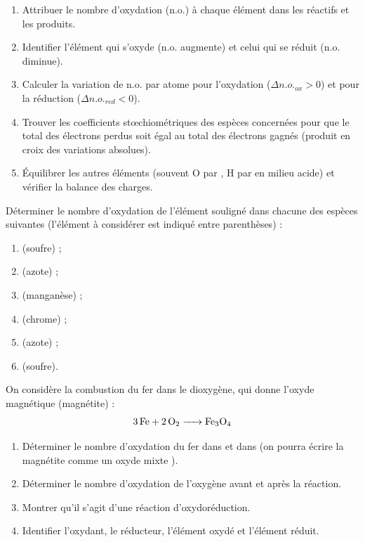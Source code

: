 \documentclass[11pt]{article}
\newcounter{popsec}
\newcounter{popsub}
\newcommand{\courssub}[1]{%
  \stepcounter{popsub}%
  \par\vspace{9pt}\noindent{\popxbold\fontsize{11.5}{13}\selectfont\color{popink}{\color{poporange}\thepopsec.\thepopsub}\hspace{6pt}#1}\par\nopagebreak\vspace{4pt}
}
\begin{document}
\courssub{Je m'entraîne}

\begin{methode}
\begin{enumerate}
\item Attribuer le nombre d'oxydation (n.o.) à chaque élément dans les réactifs et les produits.
\item Identifier l'élément qui s'oxyde (n.o. augmente) et celui qui se réduit (n.o. diminue).
\item Calculer la variation de n.o. par atome pour l'oxydation ($\Delta n.o._{ox} > 0$) et pour la réduction ($\Delta n.o._{red} < 0$).
\item Trouver les coefficients stœchiométriques des espèces concernées pour que le total des électrons perdus soit égal au total des électrons gagnés (produit en croix des variations absolues).
\item Équilibrer les autres éléments (souvent O par , H par  en milieu acide) et vérifier la balance des charges.
\end{enumerate}
\end{methode}

\begin{exercice}
Déterminer le nombre d'oxydation de l'élément souligné dans chacune des espèces suivantes (l'élément à considérer est indiqué entre parenthèses) :
\begin{enumerate}
\item {} (soufre) ;
\item {} (azote) ;
\item {} (manganèse) ;
\item {} (chrome) ;
\item {} (azote) ;
\item {} (soufre).
\end{enumerate}
\end{exercice}

\begin{exercice}
On considère la combustion du fer dans le dioxygène, qui donne l'oxyde magnétique (magnétite) :
\[ \ce{3 Fe + 2 O2 -> Fe3O4} \]
\begin{enumerate}
\item Déterminer le nombre d'oxydation du fer dans  et dans  (on pourra écrire la magnétite comme un oxyde mixte ).
\item Déterminer le nombre d'oxydation de l'oxygène avant et après la réaction.
\item Montrer qu'il s'agit d'une réaction d'oxydoréduction.
\item Identifier l'oxydant, le réducteur, l'élément oxydé et l'élément réduit.
\end{enumerate}
\end{exercice}
\end{document}
